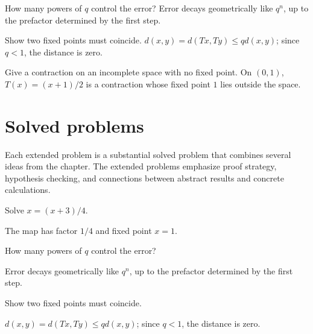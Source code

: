 \begin{example}\label{ex:ii16-worked-02}
How many powers of $q$ control the error? Error decays geometrically like $q^n$, up to the prefactor determined by the first step.
\end{example}

\begin{example}\label{ex:ii16-worked-03}
Show two fixed points must coincide. $d(x,y)=d(Tx,Ty)\le qd(x,y)$; since $q<1$, the distance is zero.
\end{example}

\begin{example}\label{ex:ii16-worked-04}
Give a contraction on an incomplete space with no fixed point. On $(0,1)$, $T(x)=(x+1)/2$ is a contraction whose fixed point $1$ lies outside the space.
\end{example}

\section{Solved problems}
Each extended problem is a substantial solved problem that combines several ideas from the chapter. The extended problems emphasize proof strategy, hypothesis checking, and connections between abstract results and concrete calculations.

\begin{problem}\label{prob:ii16-problem-01}
Solve $x=(x+3)/4$.
\end{problem}
\begin{solution}
The map has factor $1/4$ and fixed point $x=1$.
\end{solution}

\begin{problem}\label{prob:ii16-problem-02}
How many powers of $q$ control the error?
\end{problem}
\begin{solution}
Error decays geometrically like $q^n$, up to the prefactor determined by the first step.
\end{solution}

\begin{problem}\label{prob:ii16-problem-03}
Show two fixed points must coincide.
\end{problem}
\begin{solution}
$d(x,y)=d(Tx,Ty)\le qd(x,y)$; since $q<1$, the distance is zero.
\end{solution}

